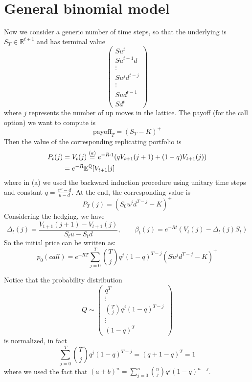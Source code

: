 \section{General binomial model}
Now we consider a generic number of time steps, so that the underlying is $S_T\in\mathbb{R}^{t+1}$ and has terminal value
\begin{equation}
    \left(
    \begin{matrix}
    Su^t \\ Su^{t-1}d \\ \vdots \\ Su^jd^{t-j} \\ \vdots \\ Sud^{t-1} \\ Sd^t
    \end{matrix}
    \right)
\end{equation}
where $j$ represents the number of up moves in the lattice. The payoff (for the call option) we want to compute is 
\begin{equation}
    \mbox{payoff}_T = (S_T-K)^+
\end{equation}
Then the value of the corresponding replicating portfolio is
\begin{align}
    \notag P_t(j) 
    &=
    \notag V_t(j) \overset{(a)}{=} e^{-R\cdot1}(qV_{t+1}(j+1) + (1-q)V_{t+1}(j)) \\
    &=
    e^{-R}\mathbb{E}^{\mathbb{Q}}[V_{t+1}|j]
\end{align}
where in (a) we used the backward induction procedure using unitary time steps and constant $q=\frac{e^R-d}{u-d}$. At the end, the corresponding value is
\begin{equation}
    P_T(j) = (S_0u^jd^{T-j}-K)^+
\end{equation}
Considering the hedging, we have
\begin{equation}
    \Delta_t(j)=\dfrac{V_{t+1}(j+1)-V_{t+1}(j)}{S_tu-S_td}, \qquad \beta_t(j)=e^{-Rt}(V_t(j)-\Delta_t(j)S_t) 
\end{equation}
So the initial price can be written as:
\begin{equation}
    p_0(call)=e^{-RT}\sum^{T}_{j=0}\binom{T}{j}q^j(1-q)^{T-j}(Su^j d^{T-j}-K)^+
\end{equation}
\begin{remark}
    Notice that the probability distribution
    \begin{equation}
        Q \sim \left(
        \begin{matrix}
        q^T \\ \vdots \\ \binom{T}{j}q^j(1-q)^{T-j} \\ \vdots \\ (1-q)^T
        \end{matrix}
        \right)
    \end{equation}
    is normalized, in fact
    \begin{equation}
        \sum^{T}_{j=0}\binom{T}{j}q^j(1-q)^{T-j} = (q+1-q)^T = 1
    \end{equation}
    where we used the fact that $(a+b)^n=\sum^{n}_{j=0}\binom{n}{j}q^j(1-q)^{n-j}$.
\end{remark}


